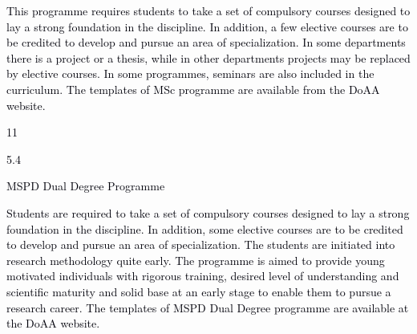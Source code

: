 \documentclass[12pt]{article}
\begin{document}
\vspace{\baselineskip}
\begin{justify}
{\fontsize{9pt}{10.8pt}\selectfont \textcolor[HTML]{00000A}{This programme requires students to take a set of compulsory courses designed to lay a strong foundation in the discipline. In addition, a few elective courses are to be credited to develop and pursue an area of specialization. In some departments there is a project or a thesis, while in other departments projects may be replaced by elective courses. In some programmes, seminars are also included in the curriculum. The templates of MSc programme are available from the DoAA website.}\par}
\end{justify}\par


\vspace{\baselineskip}

\vspace{\baselineskip}

\vspace{\baselineskip}

\vspace{\baselineskip}
\begin{Center}
\textcolor[HTML]{00000A}{11}
\end{Center}\par


\vspace{\baselineskip}
\textcolor[HTML]{00000A}{5.4 \tabto{0.36in} }{\fontsize{10pt}{12.0pt}\selectfont \textcolor[HTML]{00000A}{MSPD Dual Degree Programme}\par}\par


\vspace{\baselineskip}
\begin{justify}
{\fontsize{9pt}{10.8pt}\selectfont \textcolor[HTML]{00000A}{Students are required to take a set of compulsory courses designed to lay a strong foundation in the discipline. In addition, some elective courses are to be credited to develop and pursue an area of specialization. The students are initiated into research methodology quite early. The programme is aimed to provide young motivated individuals with rigorous training, desired level of understanding and scientific maturity and solid base at an early stage to enable them to pursue a research career. The templates of MSPD Dual Degree programme are available at the DoAA website.}\par}
\end{justify}\par
\end{document}

